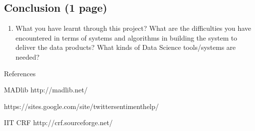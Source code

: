 \documentclass{article}
\begin{document}
\begin{enumerate}
  \section{Conclusion (1 page)}
  \begin{enumerate}\item What you have learnt through this project?
    What are the difficulties you have encountered in terms of systems and algorithms in building the system to deliver the data products?
    What kinds of Data Science tools/systems are needed?
  \end{enumerate}
\end{enumerate}

References

MADlib http://madlib.net/

https://sites.google.com/site/twittersentimenthelp/

IIT CRF http://crf.sourceforge.net/
\end{document}

